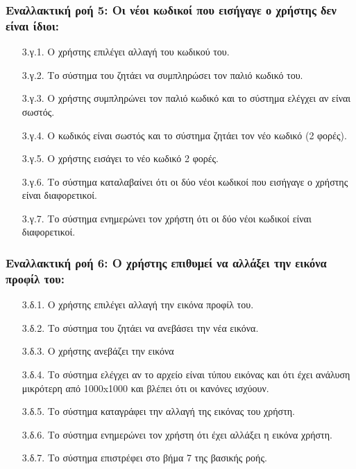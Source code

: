 \documentclass[12pt,a4paper]{article}
\begin{document}
\subsubsection*{Εναλλακτική ροή 5: Οι νέοι κωδικοί που εισήγαγε ο χρήστης δεν είναι ίδιοι:}
\begin{enumerate}
    \item [3.γ.1.] Ο χρήστης επιλέγει αλλαγή του κωδικού του. 
    \item [3.γ.2.] Το σύστημα του ζητάει να συμπληρώσει τον παλιό κωδικό του.
    \item [3.γ.3.] Ο χρήστης συμπληρώνει τον παλιό κωδικό και το σύστημα ελέγχει αν είναι σωστός.
    \item [3.γ.4.] Ο κωδικός είναι σωστός και το σύστημα ζητάει τον νέο κωδικό (2 φορές).
    \item [3.γ.5.] Ο χρήστης εισάγει το νέο κωδικό 2 φορές.
    \item [3.γ.6.] Το σύστημα καταλαβαίνει ότι οι δύο νέοι κωδικοί που εισήγαγε ο χρήστης είναι διαφορετικοί.
    \item [3.γ.7.] Το σύστημα ενημερώνει τον χρήστη ότι οι δύο νέοι κωδικοί είναι διαφορετικοί.
\end{enumerate}

\subsubsection*{Εναλλακτική ροή 6: Ο χρήστης επιθυμεί να αλλάξει την εικόνα προφίλ του:}
\begin{enumerate}
    \item [3.δ.1.] Ο χρήστης επιλέγει αλλαγή την εικόνα προφίλ του.
    \item [3.δ.2.] Το σύστημα του ζητάει να ανεβάσει την νέα εικόνα.
    \item [3.δ.3.] Ο χρήστης ανεβάζει την εικόνα
    \item [3.δ.4.] Το σύστημα ελέγχει αν το αρχείο είναι τύπου εικόνας και ότι έχει ανάλυση μικρότερη από 1000x1000 και βλέπει ότι οι κανόνες ισχύουν.
    \item [3.δ.5.] Το σύστημα καταγράφει την αλλαγή της εικόνας του χρήστη.
    \item [3.δ.6.] Το σύστημα ενημερώνει τον χρήστη ότι έχει αλλάξει η εικόνα χρήστη.
    \item [3.δ.7.] Το σύστημα επιστρέφει στο βήμα 7 της βασικής ροής.
\end{enumerate}
\end{document}
